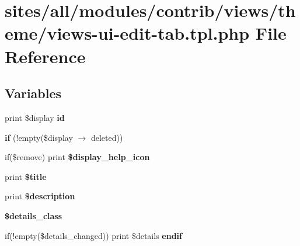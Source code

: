\hypertarget{views-ui-edit-tab_8tpl_8php}{
\section{sites/all/modules/contrib/views/theme/views-ui-edit-tab.tpl.php File Reference}
\label{views-ui-edit-tab_8tpl_8php}
}
\subsection*{Variables}
\begin{CompactItemize}
\item 
\hypertarget{views-ui-edit-tab_8tpl_8php_6249769d5f56badf1c465f2733fe3ca3}{
print \$display \textbf{id}}
\label{views-ui-edit-tab_8tpl_8php_6249769d5f56badf1c465f2733fe3ca3}

\item 
\hypertarget{views-ui-edit-tab_8tpl_8php_7a01cd194331923276551c586c20c1bb}{
\textbf{if} (!empty(\$display $\rightarrow$ deleted))}
\label{views-ui-edit-tab_8tpl_8php_7a01cd194331923276551c586c20c1bb}

\item 
\hypertarget{views-ui-edit-tab_8tpl_8php_52eef91fb888d5015d1a7dc6415a1382}{
if(\$remove) print \textbf{\$display\_\-help\_\-icon}}
\label{views-ui-edit-tab_8tpl_8php_52eef91fb888d5015d1a7dc6415a1382}

\item 
\hypertarget{views-ui-edit-tab_8tpl_8php_ec2795512d255332f57cacd930a090b4}{
print \textbf{\$title}}
\label{views-ui-edit-tab_8tpl_8php_ec2795512d255332f57cacd930a090b4}

\item 
\hypertarget{views-ui-edit-tab_8tpl_8php_6f52c29993b17bf2650a9337fb56d41d}{
print \textbf{\$description}}
\label{views-ui-edit-tab_8tpl_8php_6f52c29993b17bf2650a9337fb56d41d}

\item 
\hypertarget{views-ui-edit-tab_8tpl_8php_90778131641d39df504f0a2a8f8c1391}{
\textbf{\$details\_\-class}}
\label{views-ui-edit-tab_8tpl_8php_90778131641d39df504f0a2a8f8c1391}

\item 
\hypertarget{views-ui-edit-tab_8tpl_8php_161016dde7b624db94186204cb6cf325}{
if(!empty(\$details\_\-changed)) print \$details \textbf{endif}}
\label{views-ui-edit-tab_8tpl_8php_161016dde7b624db94186204cb6cf325}


\end{CompactItemize}
